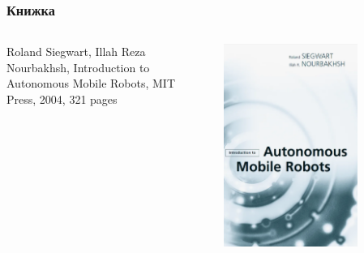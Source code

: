 \documentclass{../../slides-style}
\begin{document}
    \begin{frame}
        \frametitle{Книжка}
        \begin{columns}
            \begin{column}{0.5\textwidth}
                Roland Siegwart, Illah Reza Nourbakhsh, Introduction to Autonomous Mobile Robots, MIT Press, 2004, 321 pages
            \end{column}
            \begin{column}{0.5\textwidth}
                \begin{center}
                    \includegraphics[width=0.7\textwidth]{bookCover.png}
                \end{center}
            \end{column}
        \end{columns}
    \end{frame}
\end{document}
